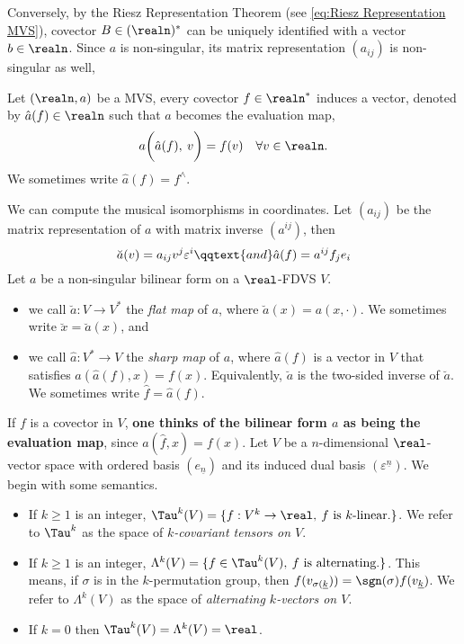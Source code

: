 \documentclass[../main-v2-manifolds.tex]{subfiles}
\begin{document}
Conversely, by the Riesz Representation Theorem (see \cref{eq:Riesz Representation MVS}), covector $B\in(\realn)^*$ can be uniquely identified with a vector $b\in\realn$. Since $a$ is non-singular, its matrix representation $(a_{ij})$ is non-singular as well,
\begin{definition}
    Let $(\realn,a)$ be a MVS, every covector $f\in \realn^*$ induces a vector, denoted by $\hat{a}(f)\in \realn$ such that $a$ becomes the evaluation map,
    \begin{equation}
        a\biggl(\hat{a}(f),\: v\biggr)=f(v)\quad\forall v\in\realn.
        \label{eq:musical isomorphism sharpen}
    \end{equation}
    We sometimes write $\hat{a}(f) = f^{\wedge}$.
\end{definition}
We can compute the musical isomorphisms in coordinates. Let $(a_{ij})$ be the matrix representation of $a$ with matrix inverse $(a^{ij})$, then 
\[
    \breve{a}(v)=a_{ij}v^j\varepsilon^i\qqtext{and}\hat{a}(f) = a^{ij}f_j e_i
\]
%
%
%
Let $a$ be a non-singular bilinear form on a $\real$-FDVS $V$.
\begin{itemize}
    \item we call $\breve{a}: V\to V^*$ the \emph{flat map} of $a$, where $\breve{a}(x) = a(x,\cdot)$. We sometimes write $\breve{x} = \breve{a}(x)$, and 
    \item we call $\hat{a}: V^*\to V$ the \emph{sharp map} of $a$, where $\hat{a}(f)$ is a vector in $V$ that satisfies $a(\hat{a}(f), x) = f(x)$. Equivalently, $\breve{a}$ is the two-sided inverse of $\breve{a}$. We sometimes write $\hat{f} = \hat{a}(f)$.
\end{itemize}
If $f$ is a covector in $V$, \textbf{one thinks of the bilinear form $a$ as being the evaluation map}, since $a(\hat{f},x) = f(x)$.
Let $V$ be a $n$-dimensional $\real$-vector space with ordered basis $(e_{\underline{n}})$ and its induced dual basis $(\varepsilon^{\underline{n}})$. We begin with some semantics.
\begin{itemize}
    \item If $k\geq 1$ is an integer, $\Tau^k(V) = \{f: V^k\to\real,\: f\text{ is }k\text{-linear.}\}$. We refer to $\Tau^k$ as the space of \emph{$k$-covariant tensors on $V$}.
    \item If $k\geq 1$ is an integer, $\Lambda^k(V) = \{f\in \Tau^k(V),\: f\text{ is alternating.}\}$. This means, if $\sigma$ is in the $k$-permutation group, then $f(v_{\sigma(\underline{k}})) = \sgn(\sigma)f(v_{\underline{k}})$. We refer to $\Lambda^k(V)$ as the space of \emph{alternating $k$-vectors on $V$}.
    \item If $k=0$ then $\Tau^k(V) = \Lambda^k(V) =\real$.
\end{itemize}
\end{document}
